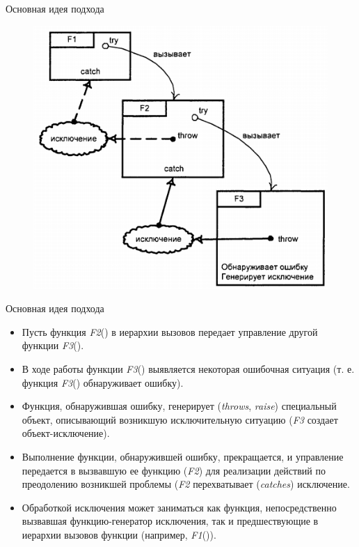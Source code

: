 \documentclass[xcolor=table]{beamer}
\begin{document}
\begin{frame}{Основная идея подхода}
	\begin{figure}[h]
		\centering
		\includegraphics[scale=0.6]{images/lec08-pic06.png}
	\end{figure}
\end{frame}

\begin{frame}{Основная идея подхода}
	\begin{itemize}
		\item Пусть функция \textit{F2}() в иерархии вызовов передает управление другой функции \textit{F3}(). 
		\item В ходе работы функции \textit{F3}() выявляется некоторая ошибочная ситуация (т. е. функция \textit{F3}() обнаруживает ошибку). 
		\item Функция, обнаружившая ошибку, генерирует (\textit{throws}, \textit{raise}) специальный объект, описывающий возникшую исключительную ситуацию (\textit{F3} создает объект-исключение). 
		\item Выполнение функции, обнаружившей ошибку, прекращается, и управление передается в вызвавшую ее функцию (\textit{F2}) для реализации действий по преодолению возникшей проблемы (\textit{F2} перехватывает (\textit{catches}) исключение. 
		\item Обработкой исключения может заниматься как функция, непосредственно вызвавшая функцию-генератор исключения, так и предшествующие в иерархии вызовов функции (например, \textit{F1}()).
	\end{itemize}
\end{frame}
\end{document}
